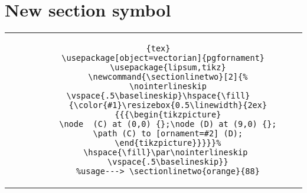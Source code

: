 \section{New section symbol}
	\begin{table}[h!]
	\begin{tabular}{c | c}
	\begin{minipage}[m]{0.4\textwidth}
	\sectionlinetwo{orange}{88}
	\end{minipage}
	&
	\begin{minipage}[m]{0.55\textwidth}
	\begin{lstlisting}[basicstyle=\footnotesize]{tex}
	\usepackage[object=vectorian]{pgfornament}  
	\usepackage{lipsum,tikz}
	\newcommand{\sectionlinetwo}[2]{%
	\nointerlineskip \vspace{.5\baselineskip}\hspace{\fill}
	{\color{#1}\resizebox{0.5\linewidth}{2ex}
	{{{\begin{tikzpicture}
	\node  (C) at (0,0) {};\node (D) at (9,0) {};
	\path (C) to [ornament=#2] (D);
	\end{tikzpicture}}}}}%
	\hspace{\fill}\par\nointerlineskip 
	\vspace{.5\baselineskip}}
	%usage---> \sectionlinetwo{orange}{88}
	\end{lstlisting}
	\end{minipage}
	\end{tabular}
	\end{table}
	